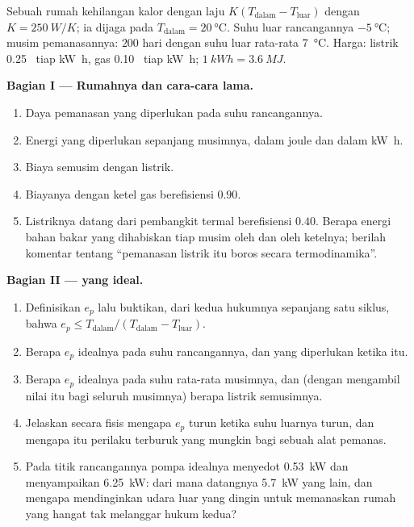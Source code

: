 \begin{problem}
\label{pb:b1:heat-engines:1}
Sebuah rumah kehilangan kalor dengan laju $K(T_{\mathrm{dalam}} - T_{\mathrm{luar}})$ dengan
$K = \qty{250}{W/K}$; ia dijaga pada $T_{\mathrm{dalam}} = \qty{20}{\degreeCelsius}$.
Suhu luar rancangannya $\qty{-5}{\degreeCelsius}$; musim pemanasannya:
$200$ hari dengan suhu luar rata-rata \qty{7}{\degreeCelsius}.
Harga: listrik 0.25~\texteuro{} tiap \unit{kW h}, gas 0.10~\texteuro{} tiap
\unit{kW h}; $\qty{1}{kW h} = \qty{3.6}{MJ}$.

\medskip
\noindent\textbf{Bagian I --- Rumahnya dan cara-cara lama.}
\begin{enumerate}
  \item Daya pemanasan yang diperlukan pada suhu rancangannya.
  \item Energi yang diperlukan sepanjang musimnya, dalam joule dan dalam \unit{kW h}.
  \item Biaya semusim dengan  listrik.
  \item Biayanya dengan ketel gas berefisiensi $0.90$.
  \item Listriknya datang dari pembangkit termal berefisiensi
        $0.40$. Berapa energi bahan bakar yang dihabiskan tiap musim oleh  dan oleh
        ketelnya; berilah komentar tentang ``pemanasan listrik itu boros secara
        termodinamika''.
\end{enumerate}

\medskip
\noindent\textbf{Bagian II ---  yang ideal.}
\begin{enumerate}[resume]
  \item Definisikan $e_p$ lalu buktikan, dari kedua hukumnya sepanjang satu siklus, bahwa
        $e_p \leq T_{\mathrm{dalam}}/(T_{\mathrm{dalam}} - T_{\mathrm{luar}})$.
  \item Berapa $e_p$ idealnya pada suhu rancangannya, dan 
        yang diperlukan ketika itu.
  \item Berapa $e_p$ idealnya pada suhu rata-rata musimnya, dan (dengan mengambil nilai
        itu bagi seluruh musimnya) berapa listrik semusimnya.
  \item Jelaskan secara fisis mengapa $e_p$ turun ketika suhu luarnya
        turun, dan mengapa itu perilaku terburuk yang mungkin bagi sebuah alat
        pemanas.
  \item Pada titik rancangannya pompa idealnya menyedot \qty{0.53}{kW} dan
        menyampaikan \qty{6.25}{kW}: dari mana datangnya \qty{5.7}{kW} yang lain,
        dan mengapa mendinginkan udara luar yang dingin untuk memanaskan rumah yang hangat
        tak melanggar hukum kedua?
\end{enumerate}


\end{problem}
